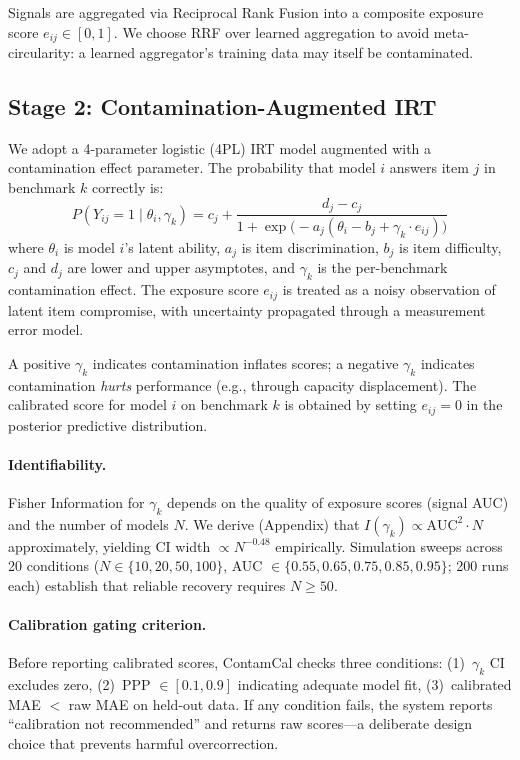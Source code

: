 \documentclass[11pt,a4paper]{article}
\newcommand{\gam}{\gamma}
\begin{document}
Signals are aggregated via Reciprocal Rank Fusion \citep[RRF;][]{cormack2009reciprocal} into a composite exposure score $e_{ij} \in [0,1]$.
We choose RRF over learned aggregation to avoid meta-circularity: a learned aggregator's training data may itself be contaminated.

\subsection{Stage 2: Contamination-Augmented IRT}
\label{sec:irt}

We adopt a 4-parameter logistic (4PL) IRT model augmented with a contamination effect parameter.
The probability that model $i$ answers item $j$ in benchmark $k$ correctly is:
\begin{equation}
P(Y_{ij} = 1 \mid \theta_i, \gam_k) = c_j + \frac{d_j - c_j}{1 + \exp\bigl(-a_j(\theta_i - b_j + \gam_k \cdot e_{ij})\bigr)}
\label{eq:4pl}
\end{equation}
where $\theta_i$ is model $i$'s latent ability, $a_j$ is item discrimination, $b_j$ is item difficulty, $c_j$ and $d_j$ are lower and upper asymptotes, and $\gam_k$ is the per-benchmark contamination effect.
The exposure score $e_{ij}$ is treated as a noisy observation of latent item compromise, with uncertainty propagated through a measurement error model.

A positive $\gam_k$ indicates contamination inflates scores; a negative $\gam_k$ indicates contamination \emph{hurts} performance (e.g., through capacity displacement).
The calibrated score for model $i$ on benchmark $k$ is obtained by setting $e_{ij} = 0$ in the posterior predictive distribution.

\paragraph{Identifiability.}
Fisher Information for $\gam_k$ depends on the quality of exposure scores (signal AUC) and the number of models $N$.
We derive (Appendix) that $I(\gam_k) \propto \text{AUC}^2 \cdot N$ approximately, yielding CI width $\propto N^{-0.48}$ empirically.
Simulation sweeps across 20 conditions ($N \in \{10, 20, 50, 100\}$, AUC $\in \{0.55, 0.65, 0.75, 0.85, 0.95\}$; 200 runs each) establish that reliable recovery requires $N \geq 50$.

\paragraph{Calibration gating criterion.}
Before reporting calibrated scores, ContamCal checks three conditions: (1)~$\gam_k$ CI excludes zero, (2)~PPP $\in [0.1, 0.9]$ indicating adequate model fit, (3)~calibrated MAE $<$ raw MAE on held-out data.
If any condition fails, the system reports ``calibration not recommended'' and returns raw scores---a deliberate design choice that prevents harmful overcorrection.
\end{document}
